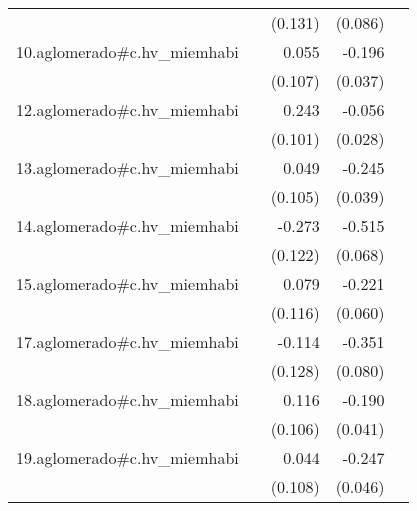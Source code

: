 {\begin{longtable}{l*{4}{D{.}{.}{-1}}}
            &                     &     (0.131)         &     (0.086)         &                     \\
\addlinespace
10.aglomerado#c.hv\_miemhabi&                     &       0.055         &      -0.196\sym{***}&                     \\
            &                     &     (0.107)         &     (0.037)         &                     \\
\addlinespace
12.aglomerado#c.hv\_miemhabi&                     &       0.243\sym{*}  &      -0.056\sym{*}  &                     \\
            &                     &     (0.101)         &     (0.028)         &                     \\
\addlinespace
13.aglomerado#c.hv\_miemhabi&                     &       0.049         &      -0.245\sym{***}&                     \\
            &                     &     (0.105)         &     (0.039)         &                     \\
\addlinespace
14.aglomerado#c.hv\_miemhabi&                     &      -0.273\sym{*}  &      -0.515\sym{***}&                     \\
            &                     &     (0.122)         &     (0.068)         &                     \\
\addlinespace
15.aglomerado#c.hv\_miemhabi&                     &       0.079         &      -0.221\sym{***}&                     \\
            &                     &     (0.116)         &     (0.060)         &                     \\
\addlinespace
17.aglomerado#c.hv\_miemhabi&                     &      -0.114         &      -0.351\sym{***}&                     \\
            &                     &     (0.128)         &     (0.080)         &                     \\
\addlinespace
18.aglomerado#c.hv\_miemhabi&                     &       0.116         &      -0.190\sym{***}&                     \\
            &                     &     (0.106)         &     (0.041)         &                     \\
\addlinespace
19.aglomerado#c.hv\_miemhabi&                     &       0.044         &      -0.247\sym{***}&                     \\
            &                     &     (0.108)         &     (0.046)         &                     \\

\end{longtable}}
